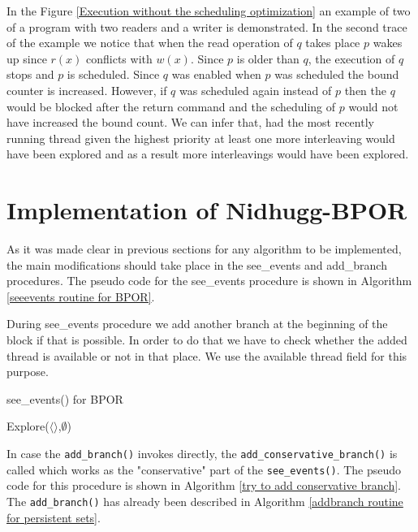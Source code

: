 
In the Figure \ref{Execution without the scheduling optimization} an example of two of a program with two readers and a
writer is demonstrated. In the second trace of the example we notice that when the read operation of $q$ takes place $p$
wakes up since $r(x)$ conflicts with $w(x)$. Since $p$ is older than $q$, the execution of $q$ stops and $p$ is
scheduled. Since $q$ was enabled when $p$ was scheduled the bound counter is increased. However, if $q$ was scheduled
again instead of $p$ then the $q$ would be blocked after the return command and the scheduling of $p$ would not have
increased the bound count. We can infer that, had the most recently running thread given the highest priority at least
one more interleaving would have been explored and as a result more interleavings would have been explored.

\section{Implementation of Nidhugg-BPOR}

As it was made clear in previous sections for any algorithm to be implemented, the main modifications should take place
in the see\_events and add\_branch procedures. The pseudo code for the see\_events procedure is shown in Algorithm
\ref{seeevents routine for BPOR}.

During see\_events procedure we add another branch at the beginning of the block if that is possible. In order to do
that we have to check whether the added thread is available or not in that place. We use the available thread field for
this purpose.

\begin{algorithm}[H]
    \caption{see\_events() for BPOR}
    \label{seeevents routine for BPOR}
    Explore($\langle \rangle$,$\emptyset$)\;
\end{algorithm}

In case the \verb|add_branch()| invokes directly, the \verb|add_conservative_branch()| is called which works as the "conservative"
part of the \verb|see_events()|. The pseudo code for this procedure is shown in Algorithm \ref{try to add conservative branch}.
The \verb|add_branch()| has already been described in Algorithm \ref{addbranch routine for persistent sets}.

